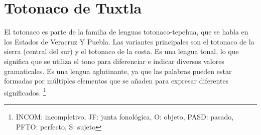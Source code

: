 \section*{Totonaco de Tuxtla}

\noindent  El totonaco es parte de la familia de lenguas totonaco-tepehua, que se habla en los Estados de Veracruz Y Puebla. Las variantes principales son el totonaco de la sierra (central del sur) y el totonaco de la costa. Es una lengua tonal, lo que significa que se utiliza el tono para diferenciar e indicar diversos valores gramaticales. Es una lengua aglutinante, ya que las palabras pueden estar formadas por múltiples elementos que se añaden para expresar diferentes significados.
\footnote{INCOM: incompletivo, JF: junta fonológica, O: objeto, PASD: pasado, PFTO: perfecto, S: sujeto}
\vspace{0.5cm}

